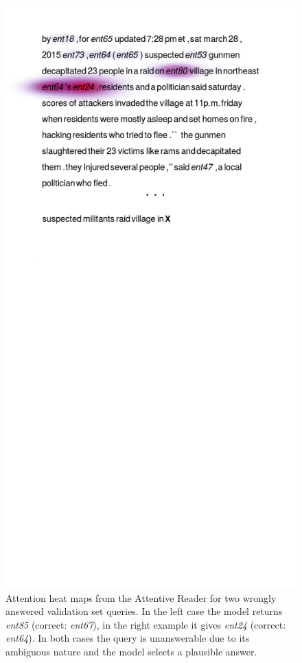 \begin{figure}[t]
  \includegraphics[scale=0.3,clip=true,trim=2cm 32cm 3cm 2cm]{figs/badexamples/351b.png}
  \caption{
	   Attention heat maps from the Attentive Reader for two
           wrongly answered validation set queries. In the left case the model
           returns \textit{ent85} (correct: \textit{ent67}), in the right example
           it gives \textit{ent24} (correct: \textit{ent64}). In both cases the
           query is unanswerable due to its ambiguous nature and the model
           selects a plausible answer.
       }
  \label{fig:heatmapsC}
\end{figure}

